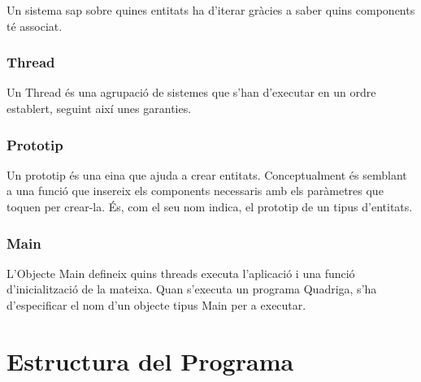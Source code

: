 Un sistema sap sobre quines entitats ha d'iterar gràcies a saber quins components té associat.

\subsubsection{Thread}

Un Thread és una agrupació de sistemes que s'han d'executar en un ordre establert, seguint així unes garanties.

\subsubsection{Prototip}

Un prototip és una eina que ajuda a crear entitats. Conceptualment és semblant a una funció que insereix els components necessaris amb els paràmetres que toquen per crear-la. És, com el seu nom indica, el prototip de un tipus d'entitats.

\subsubsection{Main}

L'Objecte Main defineix quins threads executa l'aplicació i una funció d'inicialització de la mateixa. Quan s'executa un programa Quadriga, s'ha d'especificar el nom d'un objecte tipus Main per a executar.

\section{Estructura del Programa}

